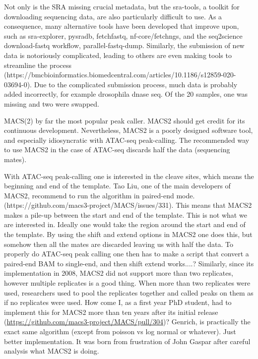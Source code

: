 Not only is the SRA missing crucial metadata, but the sra-tools, a toolkit for downloading sequencing data, are also particularly difficult to use. As a consequence, many alternative tools have been developed that improve upon, such as sra-explorer, pysradb\cite{pysradb}, fetchfastq, nf-core/fetchngs, and the seq2science download-fastq workflow, parallel-fastq-dump. Similarly, the submission of new data is notoriously complicated, leading to others are even making tools to streamline the process (https://bmcbioinformatics.biomedcentral.com/articles/10.1186/s12859-020-03694-0). Due to the complicated submission process, much data is probably added incorrectly, for example drosophila dnase seq. Of the 20 samples, one was missing and two were swapped. 

MACS(2) by far the most popular peak caller. MACS2 should get credit for its continuous development. Nevertheless, MACS2 is a poorly designed software tool, and especially idiosyncratic with ATAC-seq peak-calling. The recommended way to use MACS2 in the case of ATAC-seq discards half the data (sequencing mates).

With ATAC-seq peak-calling one is interested in the cleave sites, which means the beginning and end of the template. Tao Liu, one of the main developers of MACS2, recommend to run the algorithm in paired-end mode. (https://github.com/macs3-project/MACS/issues/331). This means that MACS2 makes a pile-up between the start and end of the template. This is not what we are interested in. Ideally one would take the region around the start and end of the template. By using the shift and extend options in MACS2 one does this, but somehow then all the mates are discarded leaving us with half the data. To properly do ATAC-seq peak calling one then has to make a script that convert a paired-end BAM to single-end, and then shift extend works....? Similarly, since its implementation in 2008, MACS2 did not support more than two replicates, however multiple replicates is a good thing. When more than two replicates were used, researchers used to pool the replicates together and called peaks on them as if no replicates were used. How come I, as a first year PhD student, had to implement this for MACS2 more than ten years after its initial release (\url{https://github.com/macs3-project/MACS/pull/304})?
Genrich, is practically the exact same algorithm (except from poisson vs log normal or whatever). Just better implementation. It was born from frustration of John Gaspar after careful analysis what MACS2 is doing\cite{Gaspar2018}.


